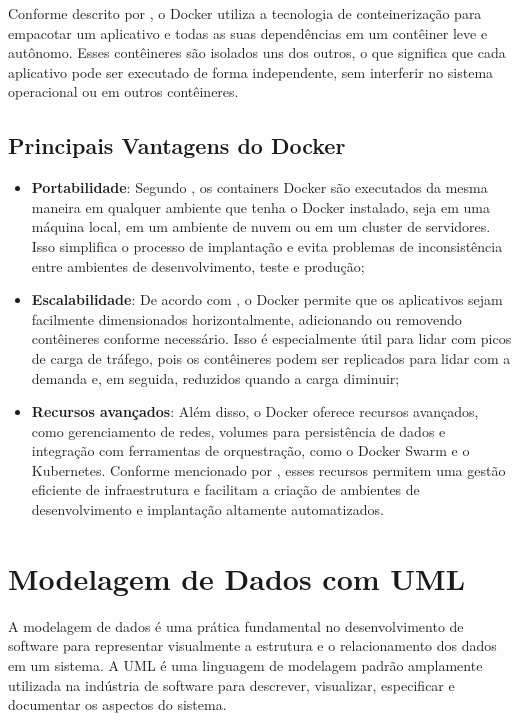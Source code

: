 Conforme descrito por \cite{Boettiger2015}, o Docker utiliza a tecnologia de conteinerização para empacotar um aplicativo e todas as suas dependências em um contêiner leve e
autônomo. Esses contêineres são isolados uns dos outros, o que significa que cada aplicativo
pode ser executado de forma independente, sem interferir no sistema operacional ou em outros
contêineres.

\subsection{Principais Vantagens do Docker}

\begin{itemize}
    \item \textbf{Portabilidade}: Segundo \cite{turner2019docker}, os containers Docker são executados da mesma maneira em qualquer ambiente que tenha o Docker instalado, seja em uma máquina local, em um ambiente de nuvem ou em um cluster de servidores. Isso simplifica o processo de implantação e evita problemas de inconsistência entre ambientes de desenvolvimento, teste e produção;

    \item \textbf{Escalabilidade}: De acordo com \cite{Muller2018}, o Docker permite que os aplicativos sejam facilmente dimensionados horizontalmente, adicionando ou removendo contêineres conforme necessário. Isso é especialmente útil para lidar com picos de carga de tráfego, pois os contêineres podem ser replicados para lidar com a demanda e, em seguida, reduzidos quando a carga diminuir;

    \item \textbf{Recursos avançados}: Além disso, o Docker oferece recursos avançados, como gerenciamento de redes, volumes para persistência de dados e integração com ferramentas de orquestração, como o Docker Swarm e o Kubernetes. Conforme mencionado por \cite{Matsumoto2017}, esses recursos permitem uma gestão eficiente de infraestrutura e facilitam a criação de ambientes de desenvolvimento e implantação altamente automatizados.
\end{itemize}

\section{Modelagem de Dados com UML}

A modelagem de dados é uma prática fundamental no desenvolvimento de software para
representar visualmente a estrutura e o relacionamento dos dados em um sistema. A UML é uma
linguagem de modelagem padrão amplamente utilizada na indústria de software para descrever,
visualizar, especificar e documentar os aspectos do sistema.


